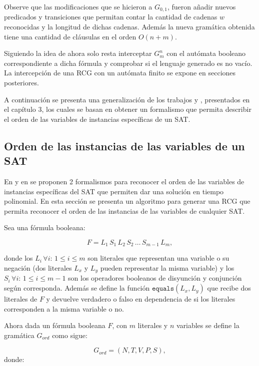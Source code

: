 \documentclass[12pt]{article}
\begin{document}
Observe que las modificaciones que se hicieron a $G_{0,1}$, fueron añadir nuevos predicados y transiciones que permitan
contar la cantidad de cadenas $w$ reconocidas y la longitud de dichas cadenas. Además la nueva gramática obtenida
tiene una cantidad de cláusulas en el orden $O(n+m)$.

Siguiendo la idea de \cite{aSMSAT} ahora solo resta interceptar $G^n_m$ con el autómata booleano correspondiente a dicha
fórmula y comprobar si el lenguaje generado es no vacío. La intercepción de una RCG con un autómata finito se expone en secciones posteriores.

A continuación se presenta una generalización de los trabajos \cite{aCFSAT} y \cite{aSRCSAT}, presentados en el capítulo 3, los cuales
se basan en obtener un formalismo que permita describir el orden de las variables de instancias específicas de un SAT.

\subsection{Orden de las instancias de las variables de un SAT}

En \cite{aCFSAT} y en \cite{aSRCSAT} se proponen 2 formalismos para reconocer el orden de las variables de instancias específicas del SAT que permiten dar una solución en tiempo polinomial. En esta sección se presenta un algoritmo para generar una RCG que permita reconocer el orden de las instancias de las variables de cualquier SAT.

Sea una fórmula booleana:

$$F=L_1\,S_1\,L_2\,S_2\,\ldots\,S_{m-1}\,L_m,$$

donde los $L_i\,\forall i:\,1\leq i\leq m$ son literales que representan una variable o su negación (dos literales
$L_x$ y $L_y$ pueden representar la misma variable) y los $S_i\,\forall i:\,1\leq i\leq m-1$ son los operadores
booleanos de disyunción y conjunción según corresponda. Además se define la función $\texttt{equals}(L_x,L_y)$
que recibe dos literales de $F$ y devuelve verdadero o falso en dependencia de si los literales corresponden
a la misma variable o no.

Ahora dada un fórmula booleana $F$, con $m$ literales y $n$ variables se define la gramática $G_{ord}$
como sigue:

\[
    G_{ord} = (N, T, V, P, S),
\]
donde:
\end{document}
